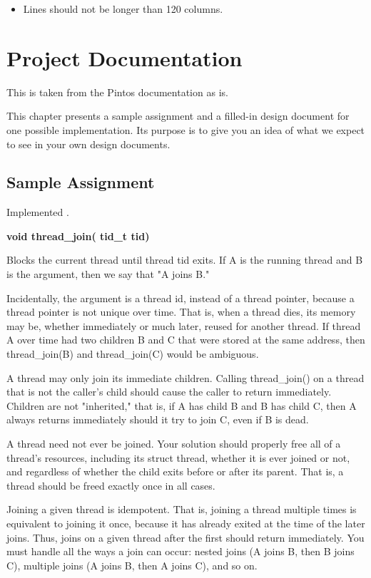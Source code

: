 \begin{appendices}
\begin{itemize}
	\item Lines should not be longer than 120 columns.
\end{itemize}

\chapter{Project Documentation}
\label{chap:ProjDoc}

This is taken from the Pintos documentation as is.

This chapter presents a sample assignment and a filled-in design document for one possible
implementation. Its purpose is to give you an idea of what we expect to see in your own
design documents.

\section{Sample Assignment}

Implemented .

\textbf{void thread\_join( tid\_t tid)}

Blocks the current thread until thread tid exits. If A is the running thread and B is
the argument, then we say that "A joins B."

Incidentally, the argument is a thread id, instead of a thread pointer, because a thread
pointer is not unique over time. That is, when a thread dies, its memory may be,
whether immediately or much later, reused for another thread. If thread A over time
had two children B and C that were stored at the same address, then thread\_join(B)
and thread\_join(C) would be ambiguous.

A thread may only join its immediate children. Calling thread\_join() on a thread
that is not the caller’s child should cause the caller to return immediately. Children
are not "inherited," that is, if A has child B and B has child C, then A always returns
immediately should it try to join C, even if B is dead.

A thread need not ever be joined. Your solution should properly free all of a thread's
resources, including its struct thread, whether it is ever joined or not, and regardless
of whether the child exits before or after its parent. That is, a thread should be freed
exactly once in all cases.

Joining a given thread is idempotent. That is, joining a thread multiple times is
equivalent to joining it once, because it has already exited at the time of the later
joins. Thus, joins on a given thread after the first should return immediately.
You must handle all the ways a join can occur: nested joins (A joins B, then B joins
C), multiple joins (A joins B, then A joins C), and so on.


\end{appendices}
